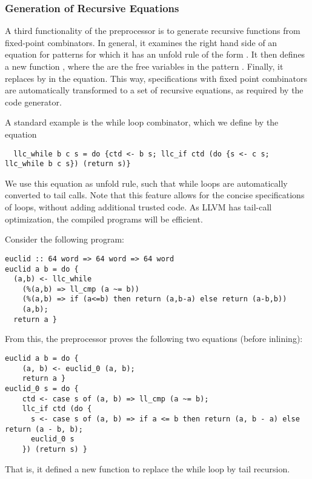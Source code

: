 \documentclass[a4paper,oribibl,envcountsame]{llncs}
\begin{document}
\subsubsection{Generation of Recursive Equations}
A third functionality of the preprocessor is to generate recursive functions from fixed-point combinators. In general,
it examines the right hand side of an equation for patterns  for which it has an unfold rule of the form .
It then defines a new function , where the  are the free variables in the pattern .
Finally, it replaces  by  in the equation. This way, specifications with fixed point combinators are automatically 
transformed to a set of recursive equations, as required by the code generator.

A standard example is the while loop combinator, which we define by the equation
\begin{lstlisting}
  llc_while b c s = do {ctd <- b s; llc_if ctd (do {s <- c s; llc_while b c s}) (return s)}
\end{lstlisting}
We use this equation as unfold rule, such that while loops are automatically converted to tail calls. Note that this 
feature allows for the concise specifications of loops, without adding additional trusted code. 
As LLVM has tail-call optimization, the compiled programs will be efficient.

\begin{example}\label{ex:euclid}
Consider the following program:
\begin{lstlisting}
euclid :: 64 word => 64 word => 64 word
euclid a b = do {
  (a,b) <- llc_while 
    (%(a,b) => ll_cmp (a ~= b))
    (%(a,b) => if (a<=b) then return (a,b-a) else return (a-b,b))
    (a,b);
  return a }
\end{lstlisting}
From this, the preprocessor proves the following two equations (before inlining):
\begin{lstlisting}
euclid a b = do {
    (a, b) <- euclid_0 (a, b);
    return a }
euclid_0 s = do {
    ctd <- case s of (a, b) => ll_cmp (a ~= b);
    llc_if ctd (do {
      s <- case s of (a, b) => if a <= b then return (a, b - a) else return (a - b, b);
      euclid_0 s
    }) (return s) }
\end{lstlisting}
That is, it defined a new function  to replace the while loop by tail recursion.
\end{example}
\end{document}

